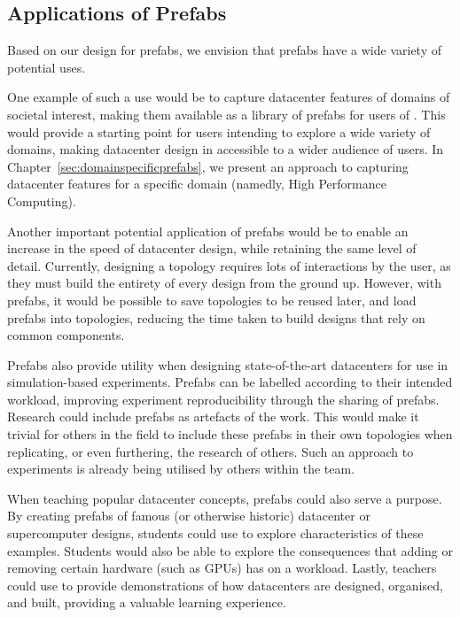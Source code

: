 \documentclass[11pt]{article}
\begin{document}
	\subsection{Applications of Prefabs}
		Based on our design for prefabs, we envision that prefabs have a wide variety of potential uses.

		One example of such a use would be to capture datacenter features of domains of societal interest, making them available as a library of prefabs for users of \opendc{}.
		This would provide a starting point for users intending to explore a wide variety of domains, making datacenter design in \opendc{} accessible to a wider audience of users.
		In Chapter~\ref{sec:domainspecificprefabs}, we present an approach to capturing datacenter features for a specific domain (namedly, High Performance Computing).

		Another important potential application of prefabs would be to enable an increase in the speed of datacenter design, while retaining the same level of detail.
		Currently, designing a topology requires lots of interactions by the user, as they must build the entirety of every design from the ground up.
		However, with prefabs, it would be possible to save topologies to be reused later, and load prefabs into topologies, reducing the time taken to build designs that rely on common components.

		Prefabs also provide utility when designing state-of-the-art datacenters for use in simulation-based experiments.
		Prefabs can be labelled according to their intended workload, improving experiment reproducibility through the sharing of prefabs.
		Research could include prefabs as artefacts of the work.
		This would make it trivial for others in the field to include these prefabs in their own topologies when replicating, or even furthering, the research of others. 
		Such an approach to experiments is already being utilised by others within the \opendc{} team.

		When teaching popular datacenter concepts, prefabs could also serve a purpose.
		By creating prefabs of famous (or otherwise historic) datacenter or supercomputer designs, students could use \opendc{} to explore characteristics of these examples.
		Students would also be able to explore the consequences that adding or removing certain hardware (such as GPUs) has on a workload.
		Lastly, teachers could use \opendc{} to provide demonstrations of how datacenters are designed, organised, and built, providing a valuable learning experience.
\end{document}
